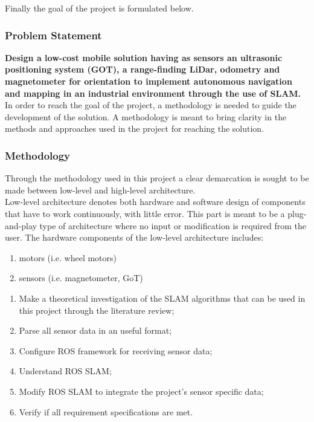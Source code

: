 \noindent Finally the goal of the project is formulated below. \\

\subsubsection{Problem Statement}

\noindent \textbf{Design a low-cost mobile solution having as sensors an ultrasonic positioning system (GOT), a range-finding LiDar, odometry and magnetometer for orientation to implement autonomous navigation and mapping in an industrial environment through the use of SLAM.}\\

\noindent In order to reach the goal of the project, a methodology is needed to guide the development of the solution. A methodology is meant to bring clarity in the methods and approaches used in the project for reaching the solution.

\subsubsection{Methodology}

Through the methodology used in this project a clear demarcation is sought to be made between low-level and high-level architecture.\\

Low-level architecture denotes both hardware and software design of components that have to work continuously, with little error. This part is meant to be a plug-and-play type of architecture where no input or modification is required from the user. The hardware components of the low-level architecture includes:

\begin{enumerate}
    \item motors (i.e. wheel motors)
    \item sensors (i.e. magnetometer, GoT)
\end{enumerate}

\begin{enumerate}
    \item Make a theoretical investigation of the SLAM algorithms that can be used in this project through the literature review;
    \item Parse all sensor data in an useful format;
    \item Configure ROS framework for receiving sensor data;
    \item Understand ROS SLAM;
    \item Modify ROS SLAM to integrate the project's sensor specific data;
    \item Verify if all requirement specifications are met.
\end{enumerate}


